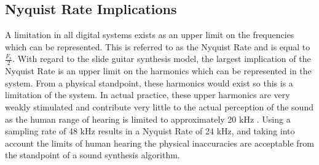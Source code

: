 \documentclass[../main.tex]{subfiles}
\begin{document}
\subsection{Nyquist Rate Implications}
A limitation in all digital systems exists as an upper limit on the frequencies which can be represented. This is referred to as the Nyquist Rate and is equal to $\frac{F_s}{2}$. With regard to the slide guitar synthesis model, the largest implication of the Nyquist Rate is an upper limit on the harmonics which can be represented in the system. From a physical standpoint, these harmonics would exist so this is a limitation of the system. In actual practice, these upper harmonics are very weakly stimulated and contribute very little to the actual perception of the sound as the human range of hearing is limited to approximately 20 kHz . Using a sampling rate of 48 kHz results in a Nyquist Rate of 24 kHz, and taking into account the limits of human hearing the physical inaccuracies are acceptable from the standpoint of a sound synthesis algorithm.



\end{document}
